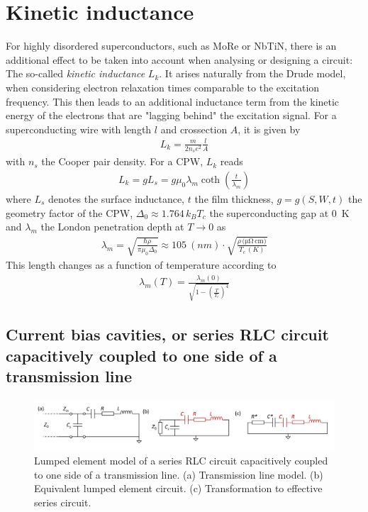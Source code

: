 \section{Kinetic inductance}
For highly disordered superconductors, such as MoRe or NbTiN, there is an additional effect to be taken into account when analysing or designing a circuit: The so-called \textit{kinetic inductance} $L_k$. It arises naturally from the Drude model, when considering electron relaxation times comparable to the excitation frequency. This then leads to an additional inductance term from the kinetic energy of the electrons that are "lagging behind" the excitation signal. For a superconducting wire with length $l$ and crossection $A$, it is given by
\begin{eqnarray}
L_k = \frac{m}{2n_s e^2}\frac{l}{A}
\end{eqnarray}
with $n_s$ the Cooper pair density. For a CPW, $L_k$ reads
\begin{eqnarray}
L_k = g L_s = g\mu_0\lambda_m\coth\left(\frac{t}{\lambda_m}\right)
\end{eqnarray}
where $L_s$ denotes the surface inductance, $t$ the film thickness, $g=g(S,W,t)$ the geometry factor of the CPW, $\Delta_0\approx1.764\,k_BT_c$ the superconducting gap at \SI{0}{K} and $\lambda_m$ the London penetration depth at $T\rightarrow0$ as
\begin{eqnarray}
\lambda_m=\sqrt{\frac{\hbar\rho}{\pi\mu_0\Delta_0}}\approx\SI{105}{(nm)}\cdot\sqrt{\frac{\rho\si{\,(\micro\ohm\,\centi\metre)}}{T_c \si{\,(K)}}}
\end{eqnarray}
This length changes as a function of temperature according to
\begin{eqnarray}
\lambda_m(T) = \frac{\lambda_m(0)}{\sqrt{1-\left(\frac{T}{T_c}\right)^4}}
\end{eqnarray}

\subsection{Current bias cavities, or series RLC circuit capacitively coupled to one side of a transmission line}
\begin{figure}[!h]
	\centering
	\includegraphics[width=0.7\linewidth]{chapter-theory/figs-RF/resonator_Daniel_crop}
	\caption{Lumped element model of a series RLC circuit capacitively coupled to one side of a transmission line. (a) Transmission line model. (b) Equivalent lumped element circuit. (c) Transformation to effective series circuit.}
	\label{fig:resonatordaniel}
\end{figure}

